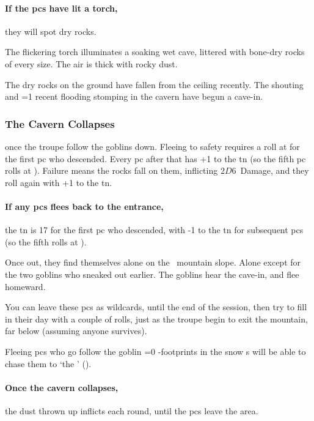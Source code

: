\begin{multicols}{2}
\paragraph{If the \glspl{pc} have lit a torch,}
they will spot dry rocks.

\begin{boxtext}
  The flickering torch illuminates a soaking wet cave, littered with bone-dry rocks of every size.
  The air is thick with rocky dust.
\end{boxtext}

The dry rocks on the ground have fallen from the ceiling recently.
The shouting and \ifnum\value{temperature}=1 recent flooding \else stomping \fi in the cavern have begun a cave-in.

\playCommentaryAftermath

\subsubsection{The Cavern Collapses}
once the troupe follow the goblins down.
Fleeing to safety requires a  roll at \tn[3] for the first \gls{pc} who descended.
Every \gls{pc} after that has +1 to the \gls{tn} (so the fifth \gls{pc} rolls at \tn[7]).
Failure means the rocks fall on them, inflicting $2D6$~Damage, and they roll again with +1 to the \gls{tn}.

\paragraph{If any \glspl{pc} flees back to the entrance,}
the \gls{tn} is 17 for the first \gls{pc} who descended, with -1 to the \gls{tn} for subsequent \glspl{pc} (so the fifth rolls at \tn[13]).

Once out, they find themselves alone on the \showTemperature\ mountain slope.
Alone except for the two goblins who sneaked out earlier.
The goblins hear the cave-in, and flee homeward.

\label{pcRunaways}
You can leave these \glspl{pc} as wildcards, until the end of the session, then try to fill in their day with a couple of rolls, just as the troupe begin to exit the mountain, far below (assuming anyone survives).

Fleeing \glspl{pc} who go follow the goblin%
\ifnum\value{temperature}=0%
 -footprints in the snow
\else%
  s
\fi%
will be able to chase them to `the ' ().

\paragraph{Once the cavern collapses,}
the dust thrown up inflicts  each \gls{round}, until the \glspl{pc} leave the \gls{area}.


\end{multicols}
